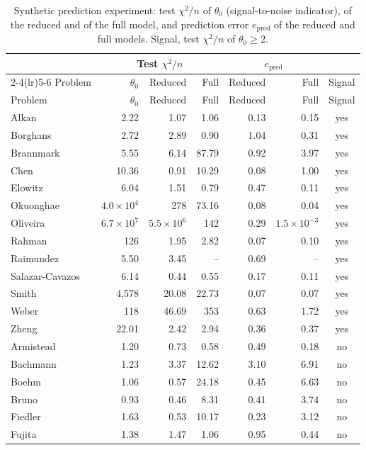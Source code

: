 {\small
\begin{longtable}{@{}lrrrrrc@{}}
\caption{Synthetic prediction experiment: test $\chi^2/n$ of $\theta_0$ (signal-to-noise indicator), of the reduced and of the full model, and prediction error $e_{\mathrm{pred}}$ of the reduced and full models. Signal, test $\chi^2/n$ of $\theta_0\ge2$.}\label{tab:synthetic}\\
\toprule & \multicolumn{3}{c}{Test $\chi^2/n$} & \multicolumn{2}{c}{$e_{\mathrm{pred}}$} & \\ \cmidrule(lr){2-4}\cmidrule(lr){5-6}
Problem & $\theta_0$ & Reduced & Full & Reduced & Full & Signal \\ \midrule \endfirsthead
\toprule Problem & $\theta_0$ & Reduced & Full & Reduced & Full & Signal \\ \midrule \endhead
Alkan & 2.22 & 1.07 & 1.06 & 0.13 & 0.15 & yes \\
Borghans & 2.72 & 2.89 & 0.90 & 1.04 & 0.31 & yes \\
Brannmark & 5.55 & 6.14 & 87.79 & 0.92 & 3.97 & yes \\
Chen & 10.36 & 0.91 & 10.29 & 0.08 & 1.00 & yes \\
Elowitz & 6.04 & 1.51 & 0.79 & 0.47 & 0.11 & yes \\
Okuonghae & $4.0\times10^{4}$ & 278 & 73.16 & 0.08 & 0.04 & yes \\
Oliveira & $6.7\times10^{7}$ & $5.5\times10^{6}$ & 142 & 0.29 & $1.5\times10^{-3}$ & yes \\
Rahman & 126 & 1.95 & 2.82 & 0.07 & 0.10 & yes \\
Raimundez & 5.50 & 3.45 & -- & 0.69 & -- & yes \\
Salazar-Cavazos & 6.14 & 0.44 & 0.55 & 0.17 & 0.11 & yes \\
Smith & 4,578 & 20.08 & 22.73 & 0.07 & 0.07 & yes \\
Weber & 118 & 46.69 & 353 & 0.63 & 1.72 & yes \\
Zheng & 22.01 & 2.42 & 2.94 & 0.36 & 0.37 & yes \\
Armistead & 1.20 & 0.73 & 0.58 & 0.49 & 0.18 & no \\
Bachmann & 1.23 & 3.37 & 12.62 & 3.10 & 6.91 & no \\
Boehm & 1.06 & 0.57 & 24.18 & 0.45 & 6.63 & no \\
Bruno & 0.93 & 0.46 & 8.31 & 0.41 & 3.74 & no \\
Fiedler & 1.63 & 0.53 & 10.17 & 0.23 & 3.12 & no \\
Fujita & 1.38 & 1.47 & 1.06 & 0.95 & 0.44 & no \\

\end{longtable}}

